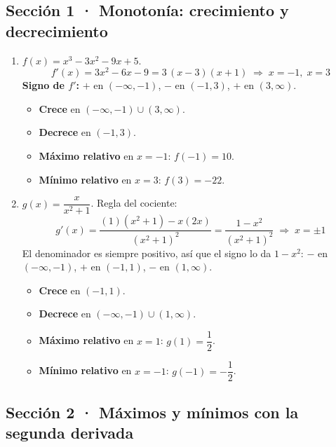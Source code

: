 \documentclass[12pt, letterpaper]{article}
\begin{document}
  \subsection*{Sección 1 · Monotonía: crecimiento y decrecimiento}

  \begin{enumerate}[leftmargin=*, label=\textbf{\arabic*.}]
    \item $f(x) = x^{3} - 3x^{2} - 9x + 5$.
    \[
      f'(x) = 3x^{2} - 6x - 9 = 3\,(x - 3)(x + 1)
      \;\Longrightarrow\; x = -1,\; x = 3
    \]
    \textbf{Signo de $f'$:} $+$ en $(-\infty,-1)$, $-$ en $(-1,3)$, $+$ en $(3,\infty)$.
    \begin{itemize}
      \item \textbf{Crece} en $(-\infty,-1) \cup (3,\infty)$.
      \item \textbf{Decrece} en $(-1,3)$.
      \item \textbf{Máximo relativo} en $x = -1$: $f(-1) = 10$.
      \item \textbf{Mínimo relativo} en $x = 3$: $f(3) = -22$.
    \end{itemize}

    \item $g(x) = \dfrac{x}{x^{2} + 1}$. Regla del cociente:
    \[
      g'(x) = \frac{(1)(x^{2}+1) - x(2x)}{(x^{2}+1)^{2}}
             = \frac{1 - x^{2}}{(x^{2}+1)^{2}}
      \;\Longrightarrow\; x = \pm 1
    \]
    El denominador es siempre positivo, así que el signo lo da $1-x^{2}$: $-$ en $(-\infty,-1)$, $+$ en $(-1,1)$, $-$ en $(1,\infty)$.
    \begin{itemize}
      \item \textbf{Crece} en $(-1,1)$.
      \item \textbf{Decrece} en $(-\infty,-1) \cup (1,\infty)$.
      \item \textbf{Máximo relativo} en $x = 1$: $g(1) = \dfrac{1}{2}$.
      \item \textbf{Mínimo relativo} en $x = -1$: $g(-1) = -\dfrac{1}{2}$.
    \end{itemize}
  \end{enumerate}

  \subsection*{Sección 2 · Máximos y mínimos con la segunda derivada}
\end{document}
